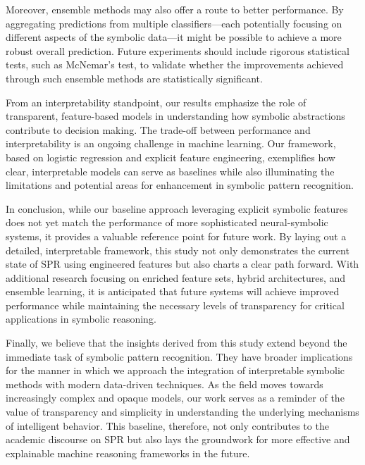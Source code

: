 \documentclass{article}
\begin{document}
Moreover, ensemble methods may also offer a route to better performance. By aggregating predictions from multiple classifiers—each potentially focusing on different aspects of the symbolic data—it might be possible to achieve a more robust overall prediction. Future experiments should include rigorous statistical tests, such as McNemar’s test, to validate whether the improvements achieved through such ensemble methods are statistically significant.

From an interpretability standpoint, our results emphasize the role of transparent, feature-based models in understanding how symbolic abstractions contribute to decision making. The trade-off between performance and interpretability is an ongoing challenge in machine learning. Our framework, based on logistic regression and explicit feature engineering, exemplifies how clear, interpretable models can serve as baselines while also illuminating the limitations and potential areas for enhancement in symbolic pattern recognition.

In conclusion, while our baseline approach leveraging explicit symbolic features does not yet match the performance of more sophisticated neural-symbolic systems, it provides a valuable reference point for future work. By laying out a detailed, interpretable framework, this study not only demonstrates the current state of SPR using engineered features but also charts a clear path forward. With additional research focusing on enriched feature sets, hybrid architectures, and ensemble learning, it is anticipated that future systems will achieve improved performance while maintaining the necessary levels of transparency for critical applications in symbolic reasoning.

Finally, we believe that the insights derived from this study extend beyond the immediate task of symbolic pattern recognition. They have broader implications for the manner in which we approach the integration of interpretable symbolic methods with modern data-driven techniques. As the field moves towards increasingly complex and opaque models, our work serves as a reminder of the value of transparency and simplicity in understanding the underlying mechanisms of intelligent behavior. This baseline, therefore, not only contributes to the academic discourse on SPR but also lays the groundwork for more effective and explainable machine reasoning frameworks in the future.
\end{document}
